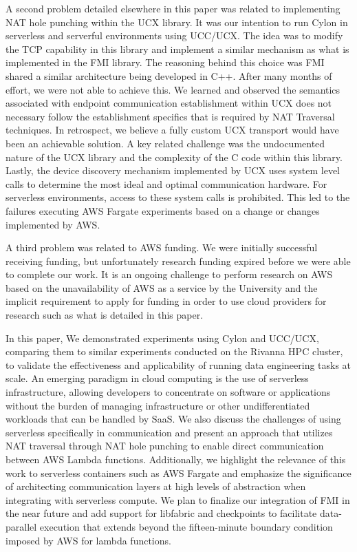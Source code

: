 A second problem detailed elsewhere in this paper was related to implementing NAT hole punching within the UCX library.  It was our intention to run Cylon in serverless and serverful environments using UCC/UCX.  The idea was to modify the TCP capability in this library and implement a similar mechanism as what is implemented in the FMI library.  The reasoning behind this choice was FMI shared a similar architecture being developed in C++.  After many months of effort, we were not able to achieve this. 
 We learned and observed the semantics associated with endpoint communication establishment within UCX does not necessary follow the establishment specifics that is required by NAT Traversal techniques.  In retrospect, we believe a fully custom UCX transport would have been an achievable solution.  A key related challenge was the undocumented nature of the UCX library and the complexity of the C code within this library.  Lastly, the device discovery mechanism implemented by UCX uses system level calls to determine the most ideal and optimal communication hardware.  For serverless environments, access to these system calls is prohibited.  This led to the failures executing AWS Fargate experiments based on a change or changes implemented by AWS.

A third problem was related to AWS funding.  We were initially successful receiving funding, but unfortunately research funding expired before we were able to complete our work.  It is an ongoing challenge to perform research on AWS based on the unavailability of AWS as a service by the University and the implicit requirement to apply for funding in order to use cloud providers for research such as what is detailed in this paper.

In this paper, We demonstrated experiments using Cylon and UCC/UCX, comparing them to similar experiments conducted on the Rivanna HPC cluster, to validate the effectiveness and applicability of running data engineering tasks at scale. An emerging paradigm in cloud computing is the use of serverless infrastructure, allowing developers to concentrate on software or applications without the burden of managing infrastructure or other undifferentiated workloads that can be handled by SaaS. We also discuss the challenges of using serverless specifically in communication and present an approach that utilizes NAT traversal through NAT hole punching to enable direct communication between AWS Lambda functions. Additionally, we highlight the relevance of this work to serverless containers such as AWS Fargate and emphasize the significance of architecting communication layers at high levels of abstraction when integrating with serverless compute. We plan to finalize our integration of FMI in the near future and add support for libfabric and checkpoints to facilitate data-parallel execution that extends beyond the fifteen-minute boundary condition imposed by AWS for lambda functions.


